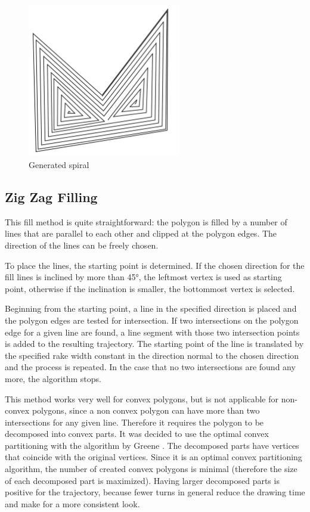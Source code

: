 \begin{figure}
\centering
\includegraphics[width=0.6\textwidth]{images/algorithms/spiral_fill/spiral_real.pdf}
\caption{Generated spiral} \label{fig:gen_spiral}
\end{figure}

\clearpage

\subsection{Zig Zag Filling}

This fill method is quite straightforward: the polygon is filled by a number of lines that are parallel to each other and clipped at the polygon edges. The direction of the lines can be freely chosen.

To place the lines, the starting point is determined. If the chosen direction for the fill lines is inclined by more than 45°, the leftmost vertex is used as starting point, otherwise if the inclination is smaller, the bottommost vertex is selected.

Beginning from the starting point, a line in the specified direction is placed and the polygon edges are tested for intersection. If two intersections on the polygon edge for a given line are found, a line segment with those two intersection points is added to the resulting trajectory. The starting point of the line is translated by the specified rake width constant in the direction normal to the chosen direction and the process is repeated. In the case that no two intersections are found any more, the algorithm stops.

This method works very well for convex polygons, but is not applicable for non-convex polygons, since a non convex polygon can have more than two intersections for any given line. Therefore it requires the polygon to be decomposed into convex parts. It was decided to use the optimal convex partitioning with the algorithm by Greene \cite{greene1983decomposition}. The decomposed parts have vertices that coincide with the original vertices. Since it is an optimal convex partitioning algorithm, the number of created convex polygons is minimal (therefore the size of each decomposed part is maximized). Having larger decomposed parts is positive for the trajectory, because fewer turns in general reduce the drawing time and make for a more consistent look.

